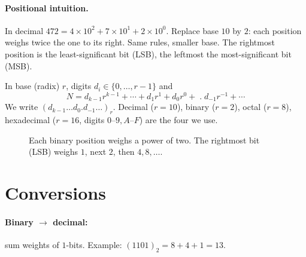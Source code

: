 \paragraph{Positional intuition.} In decimal $472 = 4\!\times\!10^2+7\!\times\!10^1+2\!\times\!10^0$.
Replace base $10$ by $2$: each position weighs twice the one to its right. Same rules, smaller base.
The rightmost position is the least-significant bit (LSB), the leftmost the most-significant bit (MSB).

\begin{definition}
In base (radix) $r$, digits $d_i\in\{0,\dots,r-1\}$ and
\[ N = d_{k-1}r^{k-1}+\cdots+d_1r^1+d_0r^0+\;.\;d_{-1}r^{-1}+\cdots \]
We write $(d_{k-1}\dots d_0.d_{-1}\dots)_r$. Decimal ($r=10$), binary ($r=2$),
octal ($r=8$), hexadecimal ($r=16$, digits $0$--$9,A$--$F$) are the four we use.
\end{definition}

\begin{figure}[h]
\centering
{}
\caption{Each binary position weighs a power of two. The rightmost bit (LSB) weighs $1$, next $2$, then $4,8,\dots$.}
\label{fig:binary-weights}
\end{figure}

\section{Conversions}
\label{sec:conversions}
\paragraph{Binary $\to$ decimal:} sum weights of $1$-bits. Example: $(1101)_2 = 8+4+1=13$.

